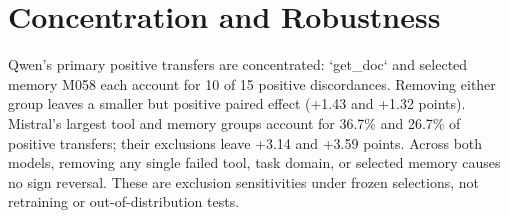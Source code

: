 \section{Concentration and Robustness}



Qwen's primary positive transfers are concentrated: `get\_doc` and selected memory M058 each account for 10 of 15 positive discordances. Removing either group leaves a smaller but positive paired effect (+1.43 and +1.32 points). Mistral's largest tool and memory groups account for 36.7\% and 26.7\% of positive transfers; their exclusions leave +3.14 and +3.59 points. Across both models, removing any single failed tool, task domain, or selected memory causes no sign reversal. These are exclusion sensitivities under frozen selections, not retraining or out-of-distribution tests.

